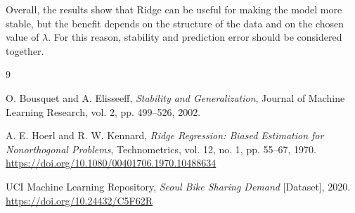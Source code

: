 \documentclass[11pt,a4paper]{article}
\begin{document}
Overall, the results show that Ridge can be useful for making the model more stable, but the benefit depends on the structure of the data and on the chosen value of $\lambda$. For this reason, stability and prediction error should be considered together.


\begin{thebibliography}{9}

O. Bousquet and A. Elisseeff,
\emph{Stability and Generalization},
Journal of Machine Learning Research, vol. 2, pp. 499--526, 2002.

A. E. Hoerl and R. W. Kennard,
\emph{Ridge Regression: Biased Estimation for Nonorthogonal Problems},
Technometrics, vol. 12, no. 1, pp. 55--67, 1970.
\url{https://doi.org/10.1080/00401706.1970.10488634}

UCI Machine Learning Repository,
\emph{Seoul Bike Sharing Demand} [Dataset], 2020.
\url{https://doi.org/10.24432/C5F62R}

\end{thebibliography}
\end{document}
